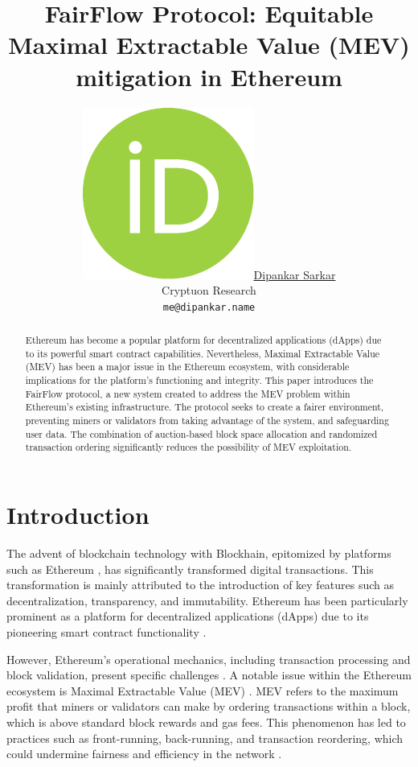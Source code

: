 \documentclass{article}
\title{FairFlow Protocol: Equitable Maximal Extractable Value (MEV) mitigation in Ethereum}
\author{ \href{https://orcid.org/0000-0001-5431-6367}{\includegraphics[scale=0.06]{orcid.pdf}\hspace{1mm}Dipankar Sarkar} \\
  Cryptuon Research \\
  \texttt{me@dipankar.name} \\
}
\begin{document}
\maketitle

\begin{abstract}
Ethereum has become a popular platform for decentralized applications (dApps) due to its powerful smart contract capabilities. Nevertheless, Maximal Extractable Value (MEV) has been a major issue in the Ethereum ecosystem, with considerable implications for the platform's functioning and integrity. This paper introduces the FairFlow protocol, a new system created to address the MEV problem within Ethereum's existing infrastructure. The protocol seeks to create a fairer environment, preventing miners or validators from taking advantage of the system, and safeguarding user data. The combination of auction-based block space allocation and randomized transaction ordering significantly reduces the possibility of MEV exploitation.
\end{abstract}


\section{Introduction}
The advent of blockchain technology with Blockhain\citep{nakamoto2008bitcoin}, epitomized by platforms such as Ethereum \citep{wood2014ethereum}, has significantly transformed digital transactions. This transformation is mainly attributed to the introduction of key features such as decentralization, transparency, and immutability. Ethereum has been particularly prominent as a platform for decentralized applications (dApps) due to its pioneering smart contract functionality \citep{buterin2014ethereum}.

However, Ethereum's operational mechanics, including transaction processing \citep{etherscan2023}  and block validation, present specific challenges \citep{ethereumfoundation2020}. A notable issue within the Ethereum ecosystem is Maximal Extractable Value (MEV) \citep{daian2019flash}. MEV refers to the maximum profit that miners or validators can make by ordering transactions within a block, which is above standard block rewards and gas fees. This phenomenon has led to practices such as front-running, back-running, and transaction reordering, which could undermine fairness and efficiency in the network \citep{qin2020quantifying}.
\end{document}
